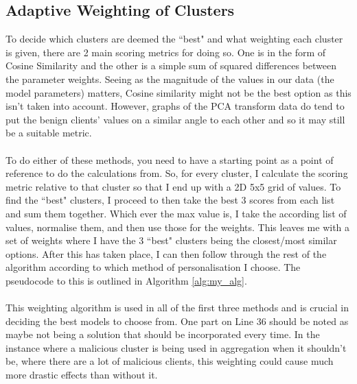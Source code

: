 \subsection{Adaptive Weighting of Clusters}
To decide which clusters are deemed the ``best" and what weighting each cluster is given, there are 2 main scoring metrics for doing so.
One is in the form of Cosine Similarity and the other is a simple sum of squared differences between the parameter weights.
Seeing as the magnitude of the values in our data (the model parameters) matters, Cosine similarity might not be the best option as this isn't taken into account.
However, graphs of the PCA transform data do tend to put the benign clients' values on a similar angle to each other and so it may still be a suitable metric.
\\ \\
To do either of these methods, you need to have a starting point as a point of reference to do the calculations from.
So, for every cluster, I calculate the scoring metric relative to that cluster so that I end up with a 2D 5x5 grid of values.
To find the ``best" clusters, I proceed to then take the best 3 scores from each list and sum them together.
Which ever the max value is, I take the according list of values, normalise them, and then use those for the weights.
This leaves me with a set of weights where I have the 3 ``best" clusters being the closest/most similar options.
After this has taken place, I can then follow through the rest of the algorithm according to which method of personalisation I choose.
The pseudocode to this is outlined in Algorithm \ref{alg:my_alg}.
\\ \\
This weighting algorithm is used in all of the first three methods and is crucial in deciding the best models to choose from.
One part on Line 36 should be noted as maybe not being a solution that should be incorporated every time.
In the instance where a malicious cluster is being used in aggregation when it shouldn't be, where there are a lot of malicious clients, this weighting could cause much more drastic effects than without it.
\\ \\
